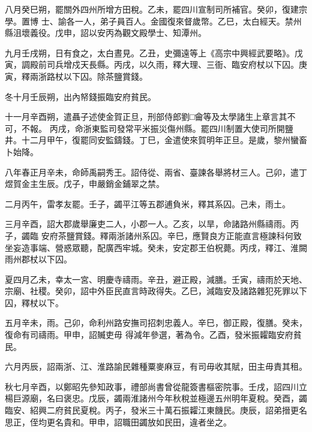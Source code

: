 \begin{pinyinscope}
 八月癸巳朔，罷關外四州所增方田稅。乙未，罷四川宣制司所補官。癸卯，復建宗學。置博
 士、諭各一人，弟子員百人。金國復來督歲幣。乙巳，太白經天。禁州縣沮壞義役。戊申，詔以安丙為觀文殿學士、知潭州。



 九月壬戌朔，日有食之，太白晝見。乙丑，史彌遠等上《高宗中興經武要略》。戊寅，調殿前司兵增戍天長縣。丙戌，以久雨，釋大理、三衙、臨安府杖以下囚。庚寅，釋兩浙路杖以下囚。除茶鹽賞錢。



 冬十月壬辰朔，出內帑錢振臨安府貧民。



 十一月辛酉朔，遣聶子述使金賀正旦，刑部侍郎劉□龠等及太學諸生上章言其不可，不報。
 丙戌，命浙東監司發常平米振災傷州縣。罷四川制置大使司所開鹽井。十二月甲午，復罷同安監鑄錢。丁巳，金遣使來賀明年正旦。是歲，黎州蠻畜卜始降。



 八年春正月辛未，命師禹嗣秀王。詔侍從、兩省、臺諫各舉將材三人。己卯，遣丁煜賀金主生辰。戊子，申嚴銷金鋪翠之禁。



 二月丙午，雷孝友罷。壬子，蠲平江等五郡逋負米，釋其系囚。己未，雨土。



 三月辛酉，詔大郡歲舉廉吏二人，小郡一人。乙亥，以旱，命諸路州縣禱雨。丙子，蠲臨
 安府茶鹽賞錢。釋兩浙諸州系囚。辛巳，應賢良方正能直言極諫科何致坐妄造事端、營惑眾聽，配廣西牢城。癸未，安定郡王伯柷薨。丙戌，釋江、淮闕雨州郡杖以下囚。



 夏四月乙未，幸太一宮、明慶寺禱雨。辛丑，避正殿，減膳。壬寅，禱雨於天地、宗廟、社稷。癸卯，詔中外臣民直言時政得失。乙巳，減臨安及諸路雜犯死罪以下囚，釋杖以下。



 五月辛未，雨。己卯，命利州路安撫司招刺忠義人。辛巳，御正殿，復膳。癸未，復命有司禱雨。甲申，詔贓吏毋
 得減年參選，著為令。乙酉，發米振糶臨安府貧民。



 六月丙辰，詔兩浙、江、淮路諭民雜種粟麥麻豆，有司毋收其賦，田主毋責其租。



 秋七月辛酉，以鄭昭先參知政事，禮部尚書曾從龍簽書樞密院事。壬戌，詔四川立楊巨源廟，名曰褒忠。戊辰，蠲兩淮諸州今年秋稅並極邊五州明年夏稅。癸酉，蠲臨安、紹興二府貧民夏稅。丙子，發米三十萬石振糶江東饑民。庚辰，詔弟搢更名思正，侄均更名貴和。甲申，詔職田蠲放如民田，違者坐之。




\end{pinyinscope}
